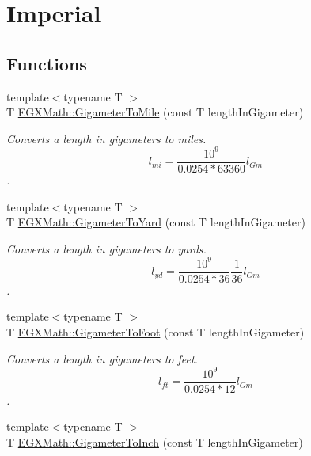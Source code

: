 \hypertarget{group___e_g_x_math-_conversions-_length_conversions-_gigameter-_imperial}{}\section{Imperial}
\label{group___e_g_x_math-_conversions-_length_conversions-_gigameter-_imperial}
\subsection*{Functions}
\begin{DoxyCompactItemize}
\item 
{\footnotesize template$<$typename T $>$ }\\T \mbox{\hyperlink{group___e_g_x_math-_conversions-_length_conversions-_gigameter-_imperial_gab61b3324bc2080e5118924bffdd0d46d}{E\+G\+X\+Math\+::\+Gigameter\+To\+Mile}} (const T length\+In\+Gigameter)
\begin{DoxyCompactList}\small\item\em Converts a length in gigameters to miles. \[ l_{mi}=\frac{10^{9}}{0.0254 * 63360} l_{Gm} \]. \end{DoxyCompactList}\item 
{\footnotesize template$<$typename T $>$ }\\T \mbox{\hyperlink{group___e_g_x_math-_conversions-_length_conversions-_gigameter-_imperial_gadc687ba83985120ec09d825adace01d6}{E\+G\+X\+Math\+::\+Gigameter\+To\+Yard}} (const T length\+In\+Gigameter)
\begin{DoxyCompactList}\small\item\em Converts a length in gigameters to yards. \[ l_{yd}= \frac{10^{9}}{0.0254 * 36} \frac{1}{36} l_{Gm} \]. \end{DoxyCompactList}\item 
{\footnotesize template$<$typename T $>$ }\\T \mbox{\hyperlink{group___e_g_x_math-_conversions-_length_conversions-_gigameter-_imperial_gaeabf3c29bcb3076a8b41986debbf046b}{E\+G\+X\+Math\+::\+Gigameter\+To\+Foot}} (const T length\+In\+Gigameter)
\begin{DoxyCompactList}\small\item\em Converts a length in gigameters to feet. \[ l_{ft}= \frac{10^{9}}{0.0254 * 12} l_{Gm} \]. \end{DoxyCompactList}\item 
{\footnotesize template$<$typename T $>$ }\\T \mbox{\hyperlink{group___e_g_x_math-_conversions-_length_conversions-_gigameter-_imperial_gacff04b5343e94d6e31e601578d190fb8}{E\+G\+X\+Math\+::\+Gigameter\+To\+Inch}} (const T length\+In\+Gigameter)

\end{DoxyCompactItemize}
